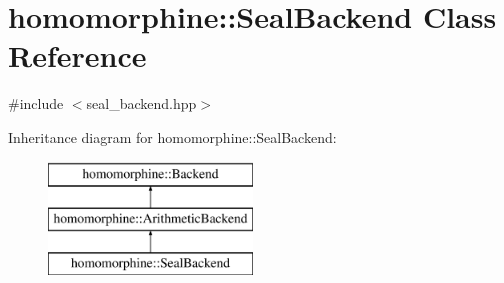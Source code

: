 \hypertarget{classhomomorphine_1_1_seal_backend}{}\section{homomorphine\+:\+:Seal\+Backend Class Reference}
\label{classhomomorphine_1_1_seal_backend}


{\ttfamily \#include $<$seal\+\_\+backend.\+hpp$>$}

Inheritance diagram for homomorphine\+:\+:Seal\+Backend\+:\begin{figure}[H]
\begin{center}
\leavevmode
\includegraphics[height=3.000000cm]{classhomomorphine_1_1_seal_backend}
\end{center}
\end{figure}
